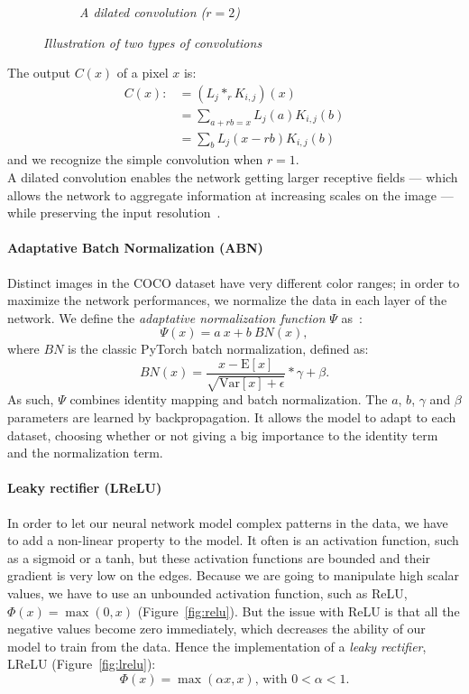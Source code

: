 \documentclass{article}
\begin{document}
\begin{figure}[!ht]
\begin{subfigure}{.49\linewidth}
                    \caption{\textit{A dilated convolution ($r=2$)}}
                    \label{fig:conv-dilated}
                \end{subfigure}
                \caption{\textit{Illustration of two types of convolutions}}
            \end{figure}

            \noindent The output $C(x)$ of a pixel $x$ is:
            \begin{align*}
            C(x):& = (L_j*_r K_{i,j})(x) \\
                 & = \sum_{a+rb=x}L_j(a)K_{i,j}(b) \\
                 & = \sum_b L_j(x-rb)K_{i,j}(b)
            \end{align*}
            and we recognize the simple convolution when $r=1$.\\
            A dilated convolution enables the network getting larger receptive fields --- which allows the network to aggregate information at increasing scales on the image --- while preserving the input resolution~\cite{dilated}.


            \paragraph{Adaptative Batch Normalization (ABN)} Distinct images in the COCO dataset have very different color ranges; in order to maximize the network performances, we normalize the data in each layer of the network. We define the \textit{adaptative normalization function} $\Psi$ as~\cite{chen2017}:
            $$\Psi(x)=a\ x+b\ BN(x),$$
            where $BN$ is the classic PyTorch batch normalization, defined as:
            $$BN(x) = \frac{x-\mathrm{E}[x]}{\sqrt{\mathrm{Var}[x]+\epsilon}}*\gamma+\beta.$$
            As such, $\Psi$ combines identity mapping and batch normalization. The $a$, $b$, $\gamma$ and $\beta$ parameters are learned by backpropagation. It allows the model to adapt to each dataset, choosing whether or not giving a big importance to the identity term and the normalization term.

            \paragraph{Leaky rectifier (LReLU)} In order to let our neural network model complex patterns in the data, we have to add a non-linear property to the model. It often is an activation function, such as a sigmoid or a tanh, but these activation functions are bounded and their gradient is very low on the edges. Because we are going to manipulate high scalar values, we have to use an unbounded activation function, such as ReLU, $\Phi(x)=\max(0,x)$ (Figure~\ref{fig:relu}). But the issue with ReLU is that all the negative values become zero immediately, which decreases the ability of our model to train from the data. Hence the implementation of a \textit{leaky rectifier}, LReLU (Figure~\ref{fig:lrelu}):
            $$\Phi(x)=\max(\alpha x,x)\mbox{, with } 0<\alpha<1.$$
\end{document}
